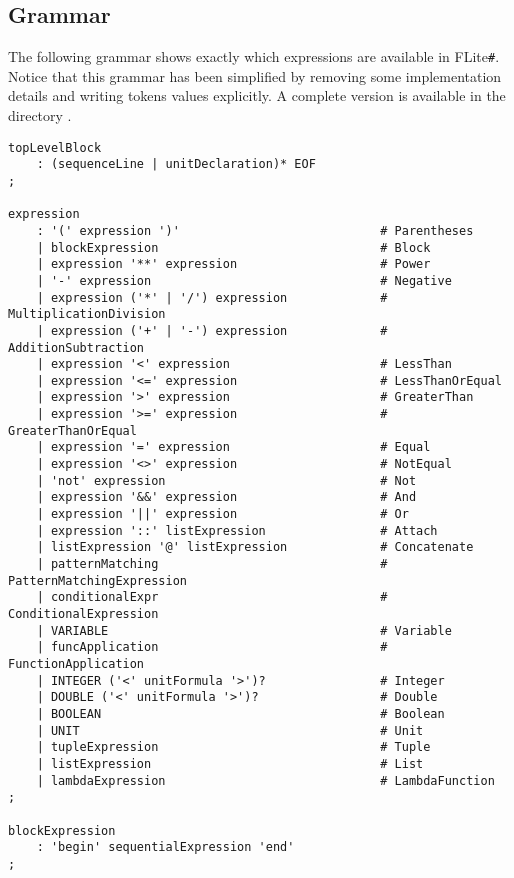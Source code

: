 \documentclass[]{article}
\begin{document}
		\subsection{Grammar}
			The following grammar shows exactly which expressions are available in FLite\verb|#|. Notice that this grammar has been simplified by removing some implementation details and writing tokens values explicitly. A complete version is available in the directory .
			\begin{lstlisting}[caption={Grammar}, label=grammar]
topLevelBlock
	: (sequenceLine | unitDeclaration)* EOF
;
	
expression
	: '(' expression ')'                            # Parentheses
	| blockExpression                               # Block
	| expression '**' expression                    # Power
	| '-' expression                                # Negative
	| expression ('*' | '/') expression             # MultiplicationDivision
	| expression ('+' | '-') expression             # AdditionSubtraction
	| expression '<' expression                     # LessThan
	| expression '<=' expression                    # LessThanOrEqual
	| expression '>' expression                     # GreaterThan
	| expression '>=' expression                    # GreaterThanOrEqual
	| expression '=' expression                     # Equal
	| expression '<>' expression                    # NotEqual
	| 'not' expression                              # Not
	| expression '&&' expression                    # And
	| expression '||' expression                    # Or
	| expression '::' listExpression                # Attach
	| listExpression '@' listExpression             # Concatenate
	| patternMatching                               # PatternMatchingExpression
	| conditionalExpr                               # ConditionalExpression
	| VARIABLE                                      # Variable
	| funcApplication                               # FunctionApplication
	| INTEGER ('<' unitFormula '>')?                # Integer
	| DOUBLE ('<' unitFormula '>')?                 # Double
	| BOOLEAN                                       # Boolean
	| UNIT                                          # Unit
	| tupleExpression                               # Tuple
	| listExpression                                # List
	| lambdaExpression                              # LambdaFunction
;
	
blockExpression
	: 'begin' sequentialExpression 'end'
;
	

\end{lstlisting}
\end{document}
